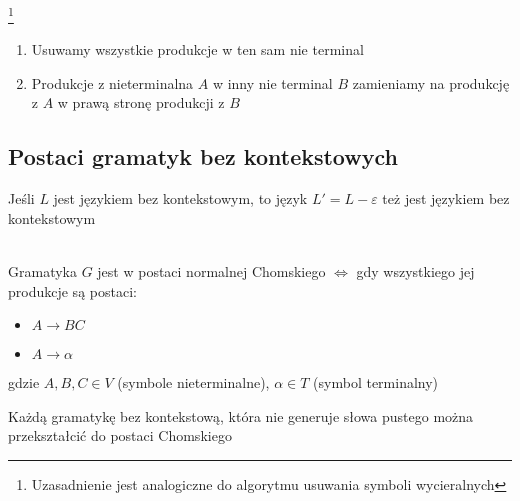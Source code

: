 	\begin{alg}\footnote{Uzasadnienie jest analogiczne do algorytmu usuwania symboli wycieralnych}~\\
		\begin{enumerate}
			\item Usuwamy wszystkie produkcje w ten sam nie terminal
			\item Produkcje z nieterminalna $A$ w inny nie terminal $B$ zamieniamy na produkcję z $A$ w prawą stronę produkcji z $B$
		\end{enumerate}
	\end{alg}
	
\subsection{Postaci gramatyk bez kontekstowych}

	\begin{tw}
		Jeśli $L$ jest językiem bez kontekstowym, to język $L' = L - \varepsilon$ też jest językiem bez kontekstowym
	\end{tw}
	
	\begin{df}~\\
		Gramatyka $G$ jest w postaci normalnej Chomskiego $\Leftrightarrow$ gdy wszystkiego jej produkcje są postaci:
		\begin{itemize}
			\item $A\rightarrow BC$
			\item $A \rightarrow \alpha$
		\end{itemize}
		gdzie $A,B,C \in V$ (symbole nieterminalne), $\alpha \in T$ (symbol terminalny)
	\end{df}
	
	\begin{lemat}
		Każdą gramatykę bez kontekstową, która nie generuje słowa pustego można przekształcić do postaci Chomskiego
	\end{lemat}
	
